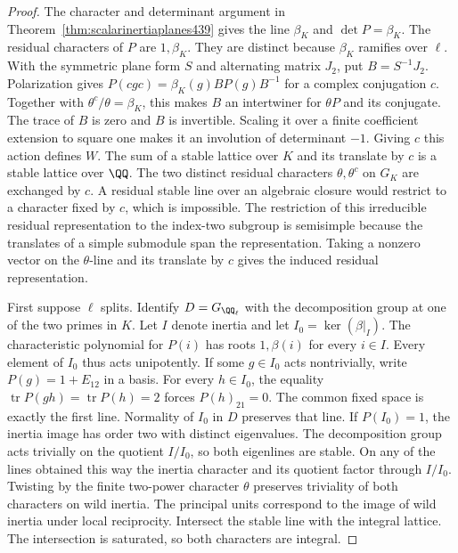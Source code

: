 \documentclass[a4paper,11pt]{article}
\theoremstyle{definition}
\theoremstyle{remark}
\numberwithin{equation}{section}
\begin{document}
\begin{proof}
The character and determinant argument in
Theorem~\ref{thm:scalarinertiaplanes439} gives the line
\(\beta_K\) and \(\det P=\beta_K\). The residual characters of
\(P\) are \(1,\beta_K\). They are distinct because \(\beta_K\)
ramifies over \(\ell\). With the symmetric plane form \(S\)
and alternating matrix \(J_2\), put \(B=S^{-1}J_2\).
Polarization gives
\(P(cgc)=\beta_K(g)BP(g)B^{-1}\) for a complex conjugation
\(c\). Together with \(\theta^c/\theta=\beta_K\), this makes
\(B\) an intertwiner for \(\theta P\) and its conjugate.
The trace of \(B\) is zero and \(B\) is invertible. Scaling it
over a finite coefficient extension to square one makes it an
involution of determinant \(-1\). Giving \(c\) this action
defines \(W\). The sum of a stable lattice over \(K\) and its
translate by \(c\) is a stable lattice over \(\QQ\).
The two distinct residual characters \(\theta,\theta^c\) on
\(G_K\) are exchanged by \(c\). A residual stable line over
an algebraic closure would restrict to a character fixed by
\(c\), which is impossible. The restriction of this irreducible
residual representation to the index-two subgroup is semisimple
because the translates of a simple submodule span the representation.
Taking a nonzero vector on the \(\theta\)-line and its translate
by \(c\) gives the induced residual representation.

First suppose \(\ell\) splits. Identify \(D=G_{\QQ_\ell}\)
with the decomposition group at one of the two primes in \(K\).
Let \(I\) denote inertia and let \(I_0=\ker(\beta|_I)\).
The characteristic polynomial for \(P(i)\) has roots \(1,\beta(i)\)
for every \(i\in I\). Every element of \(I_0\) thus acts
unipotently. If some \(g\in I_0\) acts nontrivially, write
\(P(g)=1+E_{12}\) in a basis. For every \(h\in I_0\), the
equality \(\operatorname{tr}P(gh)=\operatorname{tr}P(h)=2\)
forces \(P(h)_{21}=0\). The common fixed space is exactly
the first line. Normality of \(I_0\) in \(D\) preserves that
line. If \(P(I_0)=1\), the inertia image has order two with
distinct eigenvalues. The decomposition group acts trivially
on the quotient \(I/I_0\), so both eigenlines are stable.
On any of the lines obtained this way the inertia character
and its quotient factor through \(I/I_0\). Twisting by the
finite two-power character \(\theta\) preserves triviality of
both characters on wild inertia. The principal units correspond
to the image of wild inertia under local reciprocity. Intersect
the stable line with the integral lattice. The intersection is
saturated, so both characters are integral.


\end{proof}
\end{document}

